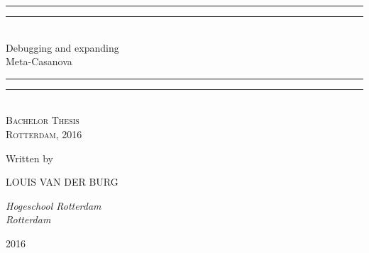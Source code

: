 \newcommand*{\titleGP}{\begingroup %
\centering %
\vspace*{\baselineskip} %

\rule{\textwidth}{1.6pt}\vspace*{-\baselineskip}\vspace*{2pt} %
\rule{\textwidth}{0.4pt}\\[0.5\baselineskip] %

{\LARGE Debugging and expanding \\ [0.4\baselineskip] Meta-Casanova }\\[0.2\baselineskip] %

\rule{\textwidth}{0.4pt}\vspace*{-\baselineskip}\vspace{3.2pt} %
\rule{\textwidth}{1.6pt}\\[\baselineskip] %

\scshape %
Bachelor Thesis\\[\baselineskip] %
Rotterdam, 2016\par %

\vspace*{3\baselineskip} %

Written by \\[0.3\baselineskip]
{\Large LOUIS VAN DER BURG \par} %
{\itshape Hogeschool Rotterdam \\ Rotterdam\par} %

\vspace*{1.5\baselineskip} %

\vfill %

{\scshape 2016} \\[0.3\baselineskip] %

\endgroup}


%


\titleGP %

%

